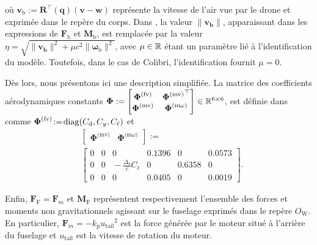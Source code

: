 \endgroup
où $\boldsymbol{v}_{\text{b}} := \boldsymbol{R}^\top(\boldsymbol{q}) (\boldsymbol{v}-\boldsymbol{w})$ représente la vitesse de l'air vue par le drone et exprimée dans le repère du corps. Dans \cite{lustosaHal-03035938}, la valeur $\lVert \boldsymbol{v_{\text{b}}} \rVert$, apparaissant dans les expressions de  $\boldsymbol{F}_{\text{b}}$ et $\boldsymbol{M}_{\text{b}}$, est remplacée par la valeur $\eta = \sqrt{\lVert \boldsymbol{v_{\text{b}}} \rVert^{2} + \mu c^{2} \lVert \boldsymbol{\omega}_{\text{b}} \rVert^{2}}$, avec $\mu \in {\mathbb R}$ étant un paramètre lié à l'identification du modèle. Toutefois, dans le cas de Colibri, l'identification fournit $\mu = 0$. 

Dès lors, nous présentons ici une description simplifiée. La matrice des coefficients aérodynamiques constants 
$\boldsymbol{\Phi}:= \begin{bmatrix} \boldsymbol{\Phi}^{\text{(fv)}} & {\boldsymbol{\Phi}^{\text{(mv)}}}^\top \\ \boldsymbol{\Phi}^{\text{(mv)}} & \boldsymbol{\Phi}^{\text{(m$\omega$)}} \end{bmatrix} \in {\mathbb R}^{6 \times 6}$, est définie dans \cite[eqs. (6)--(9)]{olszaneckibarthHal-02542982} comme $ \boldsymbol{\Phi}^{\text{(fv)}} \!:=\! \operatorname{diag}(C_{\text{d}},C_{y}, C_{\ell})$ et
\begin{align*}
&\left[ \begin{array}{c|c}
    \boldsymbol{\Phi}^{\text{(mv)}}  &  \boldsymbol{\Phi}^{\text{(m$\omega$)}} 
\end{array}\right] :=\\ 
&\left[ \begin{array}{ccc|ccc}
    0 & 0 & 0    &                                          0.1396 & 0 & 0.0573 \\
    0 & 0 & \!\!\!\!\! -\frac{\Delta_{\text{r}}}{c}C_{\ell} &    0 &  0.6358  & 0 \\
    0 & 0 & 0 &     0.0405 & 0 & 0.0019 
\end{array}\right].
\end{align*}




Enfin, $\boldsymbol{F}_{\text{F}} = \boldsymbol{F}_{m}$ et $\boldsymbol{M}_{\text{F}}$ représentent respectivement l'ensemble des forces et moments non gravitationnels agissant sur le fuselage exprimés dans le repère $O_{\text{W}}$. En particulier, $\boldsymbol{F}_{m} = - k_{\text{p}} {u_{\text{tail}}}^{2}$ est la force générée par le moteur situé à l'arrière du fuselage et $u_{\text{tail}}$ est la vitesse de rotation du moteur.

